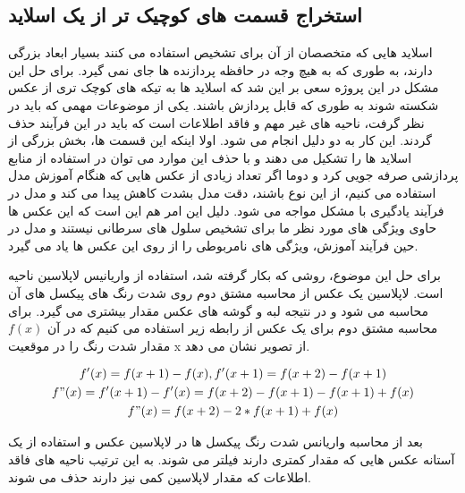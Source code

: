 \subsection{استخراج قسمت های کوچیک تر از یک اسلاید}\label{subsec:استخراج-قسمت-های-کوچیک-تر-از-یک-اسلاید}

اسلاید هایی که متخصصان از آن برای تشخیص استفاده می کنند بسیار ابعاد بزرگی دارند، به طوری که به هیچ وجه در
حافظه پردازنده ها جای نمی گیرد.
برای حل این مشکل در این پروژه سعی بر این شد که اسلاید ها به تیکه های کوچک تری از عکس شکسته شوند به طوری که قابل پردازش باشند.
یکی از موضوعات مهمی که باید در نظر گرفت، ناحیه های غیر مهم و فاقد اطلاعات است که باید در این فرآیند حذف گردند. این کار به دو دلیل انجام می شود.
اولا اینکه این قسمت ها، بخش بزرگی از اسلاید ها را تشکیل می دهند و با حذف این موارد می توان در استفاده از منابع پردازشی صرفه جویی کرد
و دوما اگر تعداد زیادی از عکس هایی که هنگام آموزش مدل استفاده می کنیم، از این نوع باشند، دقت مدل بشدت کاهش پیدا می کند و مدل در فرآیند یادگیری با مشکل مواجه می شود.
دلیل این امر هم این است که این عکس ها حاوی ویژگی های مورد نظر ما برای تشخیص سلول های سرطانی نیستند و مدل در حین فرآیند آموزش، ویژگی های نامربوطی را از روی این عکس ها یاد می گیرد.

برای حل این موضوع، روشی که بکار گرفته شد، استفاده از واریانیس لاپلاسین ناحیه است.
لاپلاسین یک عکس از محاسبه مشتق دوم روی شدت رنگ های پیکسل های آن محاسبه می شود
و در نتیجه لبه و گوشه های عکس مقدار بیشتری می گیرد.
برای محاسبه مشتق دوم برای یک عکس از رابطه زیر استفاده می کنیم که در آن $f(x)$ مقدار شدت رنگ را در موقعیت x از تصویر نشان می دهد.

\begin{gather*}
    f'(x) = f(x+1) - f(x), f'(x+1) = f(x+2) - f(x+1)\\
    f"(x) = f'(x+1) - f'(x)= f(x+2) - f(x+1) - f(x+1) + f(x)\\
    f"(x) = f(x+2) - 2*f(x+1) + f(x)\\
\end{gather*}

بعد از محاسبه واریانس شدت رنگ پیکسل ها در لاپلاسین عکس و استفاده از یک آستانه عکس هایی که مقدار کمتری دارند فیلتر می شوند.
به این ترتیب ناحیه های فاقد اطلاعات که مقدار لاپلاسین کمی نیز دارند حذف می شوند.

